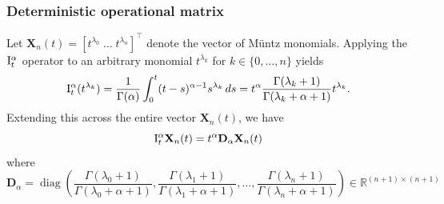 \documentclass[11pt, a4paper]{article}
\theoremstyle{theoremstyle}
\theoremstyle{definitionstyle}
\newcommand{\dd}{\mathop{}\!d}
\DeclareMathOperator{\diag}{diag}
\begin{document}
\subsubsection{Deterministic operational matrix}
Let $\mathbf X_n(t) = [t^{\lambda_0} \; \dots \; t^{\lambda_n}]^\top$ denote the vector of M\"untz monomials. Applying the $\II$ operator to an arbitrary monomial $t^{\lambda_k}$ for $k \in \{0, \dots , n\}$ yields
\begin{equation}
    \II (t^{\lambda_k}) = \frac 1{\Gamma(\alpha)} \int_0^t (t - s)^{\alpha - 1}s^{\lambda_k}\dd{s} = t^\alpha \frac{\Gamma(\lambda_k + 1)}{\Gamma(\lambda_k + \alpha + 1)}t^{\lambda_k}.
\end{equation}
Extending this across the entire vector $\mathbf X_n(t)$, we have
\begin{equation}
    \II \mathbf X_n(t) = t^{\alpha} \mathbf D_\alpha \mathbf X_n(t)
\end{equation}
where
\begin{equation}
    \mathbf D_\alpha = \diag \left ( \frac{\Gamma(\lambda_0 + 1)}{\Gamma(\lambda_0 + \alpha + 1)}, \frac{\Gamma(\lambda_1 + 1)}{\Gamma(\lambda_1 + \alpha + 1)}, \dots , \frac{\Gamma(\lambda_n + 1)}{\Gamma(\lambda_n + \alpha + 1)} \right ) \in \mathbb R^{(n+1) \times (n+1)}
\end{equation}
\end{document}
